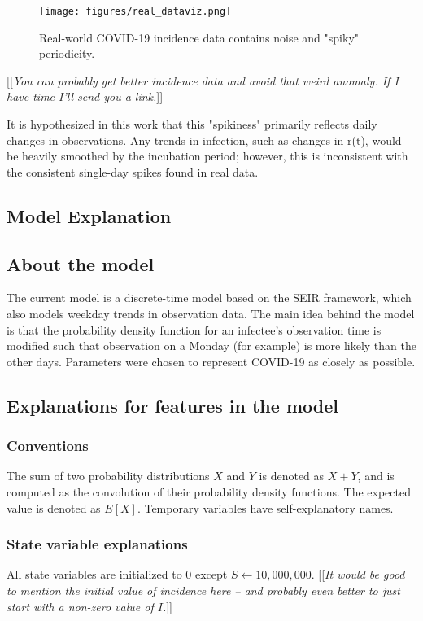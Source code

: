 \documentclass{article}
\newcommand{\jd}[1]{[[\textsl{#1}]]}
\begin{document}
\clearpage
\begin{figure}[h!]
\centering
\texttt{[image: figures/real\_dataviz.png]}
\caption{Real-world COVID-19 incidence data contains noise and "spiky" periodicity. \cite{OWID}}
\end{figure}
\jd{You can probably get better incidence data and avoid that weird anomaly. If I have time I'll send you a link.}


It is hypothesized in this work that this "spikiness" primarily reflects daily changes in observations. Any trends in infection, such as changes in r(t), would be heavily smoothed by the incubation period; however, this is inconsistent with the consistent single-day spikes found in real data.

\subsection{Model Explanation}

\subsection{About the model}
The current model is a discrete-time model based on the SEIR framework, which also models weekday trends in observation data. The main idea behind the model is that the probability density function for an infectee's observation time is modified such that observation on a Monday (for example) is more likely than the other days. Parameters were chosen to represent COVID-19 as closely as possible.

\subsection{Explanations for features in the model}

\subsubsection{Conventions}
The sum of two probability distributions $X$ and $Y$ is denoted as $X+Y$, and is computed as the convolution of their probability density functions. The expected value is denoted as $E[X]$. Temporary variables have self-explanatory names.

\subsubsection{State variable explanations}
All state variables are initialized to 0 except $S \gets 10,000,000$. 
\jd{It would be good to mention the initial value of incidence here -- and probably even better to just start with a non-zero value of $I$.}
\end{document}
